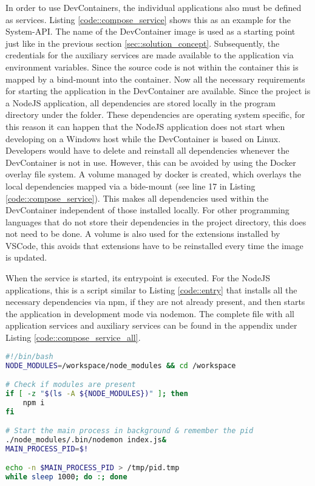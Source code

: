         In order to use DevContainers, the individual applications also must be defined as services. Listing \ref{code::compose_service} shows this as an example for the System-\ac{API}. The name of the DevContainer image is used as a starting point just like in the previous section \ref{sec::solution_concept}. Subsequently, the credentials for the auxiliary services are made available to the application via environment variables. Since the source code is not within the container this is mapped by a bind-mount into the container. Now all the necessary requirements for starting the application in the DevContainer are available.\newline
        Since the project is a NodeJS application, all dependencies are stored locally in the program directory under the  folder. These dependencies are operating system specific, for this reason it can happen that the NodeJS application does not start when developing on a Windows host while the DevContainer is based on Linux. Developers would have to delete and reinstall all dependencies whenever the DevContainer is not in use. However, this can be avoided by using the Docker overlay file system. A volume managed by docker is created, which overlays the local dependencies mapped via a bide-mount (see line 17 in Listing \ref{code::compose_service}). This makes all dependencies used within  the DevContainer independent of those installed locally. For other programming languages that do not store their dependencies in the project directory, this does not need to be done. A volume is also used for the extensions installed by VSCode, this avoids that extensions have to be reinstalled every time the image is updated.\newline
        
        When the service is started, its entrypoint is executed. For the NodeJS applications, this is a script similar to Listing \ref{code::entry} that installs all the necessary dependencies via npm, if they are not already present, and then starts the application in development mode via nodemon. The complete  file with all application services and auxiliary services can be found in the appendix under Listing \ref{code::compose_service_all}.
    \begin{lstlisting}[language=bash,caption={DevContainer \code{entryscript.sh}},breaklines=true,label={code::entry}]
#!/bin/bash
NODE_MODULES=/workspace/node_modules && cd /workspace

# Check if modules are present
if [ -z "$(ls -A ${NODE_MODULES})" ]; then
    npm i
fi

# Start the main process in background & remember the pid
./node_modules/.bin/nodemon index.js&
MAIN_PROCESS_PID=$!

echo -n $MAIN_PROCESS_PID > /tmp/pid.tmp
while sleep 1000; do :; done
        \end{lstlisting}
